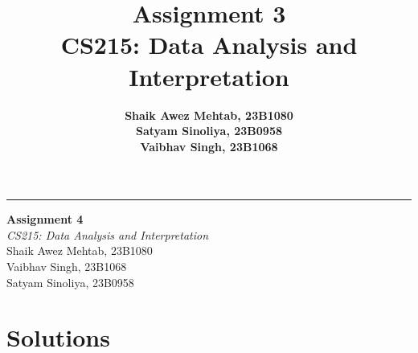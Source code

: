 \documentclass[oneside]{report}
\title{
\vspace{3cm} 
\Huge \textbf{Assignment 3}\\
\vspace{0.5cm}
\Large CS215: Data Analysis and Interpretation
\vspace{0.5cm}
}
\author{
    \textbf{Shaik Awez Mehtab, 23B1080} \\
    \textbf{Satyam Sinoliya, 23B0958} \\
    \textbf{Vaibhav Singh, 23B1068}
}
\date{}
\begin{document}
\begin{titlepage}
	\raggedleft
	\rule{1pt}{\textheight}
	\hspace{0.05\textwidth}
	\parbox[b]{0.75\textwidth}{
	{\Huge\bfseries Assignment 4\\[2\baselineskip]}
		{\Large\textit{CS215: Data Analysis and Interpretation}}\\[4\baselineskip]
	{\Large{Shaik Awez Mehtab, 23B1080 \\ Vaibhav Singh, 23B1068 \\ Satyam Sinoliya, 23B0958}}\\
	\vspace{0.5\textheight}
	}
\end{titlepage}
\chapter{Solutions}


\setcounter{equation}{0}

\end{document}
